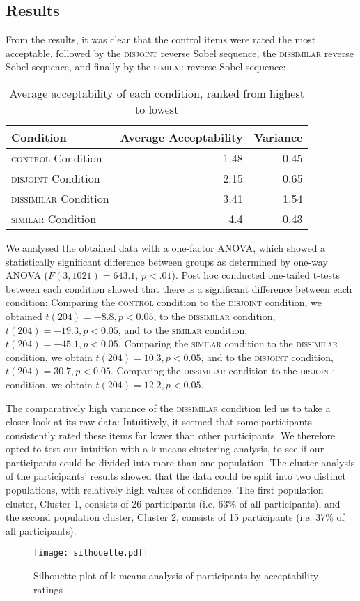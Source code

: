 \subsection{Results}
From the results, it was clear that the control items were rated the most acceptable, followed by the {\scshape disjoint} reverse Sobel sequence, the {\scshape dissimilar} reverse Sobel sequence, and finally by the {\scshape similar} reverse Sobel sequence: 
\begin{table}[!htb]
    \caption{Average acceptability of each condition, ranked from highest to lowest}
    \begin{tabular}{lrr}
    \toprule
        Condition & Average Acceptability & Variance\\\midrule
        {\scshape control} Condition & 1.48 & 0.45 \\
        {\scshape disjoint} Condition & 2.15 & 0.65 \\
        {\scshape dissimilar} Condition & 3.41 & 1.54 \\
        {\scshape similar} Condition & 4.4 & 0.43\\
        \bottomrule
    \end{tabular}
\end{table}

We analysed the obtained data with a one-factor ANOVA, which showed a statistically significant difference between groups as determined by one-way ANOVA ($F(3,1021) = 643.1$, $p < .01$). Post hoc conducted one-tailed t-tests between each condition showed that there is a significant difference between each condition: Comparing the {\scshape control} condition to the {\scshape disjoint} condition, we obtained $t(204)=-8.8, p<0.05$, to the {\scshape dissimilar} condition, $t(204)=-19.3, p<0.05$, and to the {\scshape similar} condition, $t(204)=-45.1, p<0.05$. Comparing the {\scshape similar} condition to the {\scshape dissimilar} condition, we obtain $t(204)=10.3, p<0.05$, and to the {\scshape disjoint} condition, $t(204)=30.7, p<0.05$. Comparing the {\scshape dissimilar} condition to the {\scshape disjoint} condition, we obtain $t(204)=12.2, p<0.05$.

The comparatively high variance of the {\scshape dissimilar} condition led us to take a closer look at its raw data: Intuitively, it seemed that some participants consistently rated these items far lower than other participants. We therefore opted to test our intuition with a k-means clustering analysis, to see if our participants could be divided into more than one population. The cluster analysis of the participants' results showed that the data could be split into two distinct populations, with relatively high values of confidence. The first population cluster, Cluster 1, consists of 26 participants (i.e. 63\% of all participants), and the second population cluster, Cluster 2, consists of 15 participants (i.e. 37\% of all participants).
\begin{figure}[!htb]
    \texttt{[image: silhouette.pdf]}
    \caption{Silhouette plot of k-means analysis of participants by acceptability ratings}
\end{figure}

